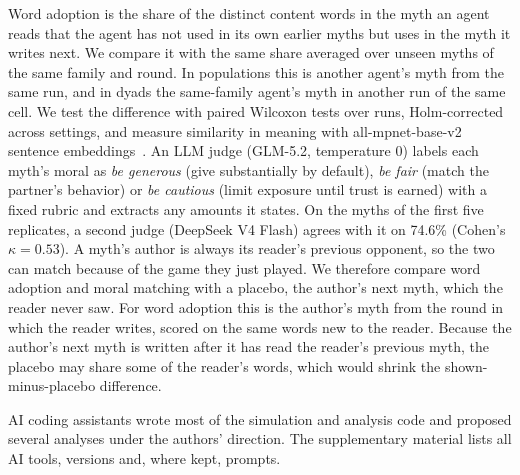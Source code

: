 Word adoption is the share of the distinct content words in the myth an agent reads that the agent has not used in its own earlier myths but uses in the myth it writes next. We compare it with the same share averaged over unseen myths of the same family and round. In populations this is another agent's myth from the same run, and in dyads the same-family agent's myth in another run of the same cell. We test the difference with paired Wilcoxon tests over runs, Holm-corrected across settings, and measure similarity in meaning with all-mpnet-base-v2 sentence embeddings~\citep{reimers2019}. An LLM judge (GLM-5.2, temperature 0) labels each myth's moral as \emph{be generous} (give substantially by default), \emph{be fair} (match the partner's behavior) or \emph{be cautious} (limit exposure until trust is earned) with a fixed rubric and extracts any amounts it states. On the myths of the first five replicates, a second judge (DeepSeek V4 Flash) agrees with it on 74.6\% (Cohen's $\kappa=0.53$). A myth's author is always its reader's previous opponent, so the two can match because of the game they just played. We therefore compare word adoption and moral matching with a placebo, the author's next myth, which the reader never saw. For word adoption this is the author's myth from the round in which the reader writes, scored on the same words new to the reader. Because the author's next myth is written after it has read the reader's previous myth, the placebo may share some of the reader's words, which would shrink the shown-minus-placebo difference.

AI coding assistants wrote most of the simulation and analysis code and proposed several analyses under the authors' direction. The supplementary material lists all AI tools, versions and, where kept, prompts.
